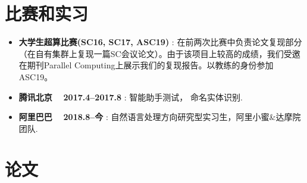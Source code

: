 \documentclass[letterpaper]{article}
\begin{document}
\section*{比赛和实习}
\begin{itemize}
  \item \textbf{大学生超算比赛(SC16, SC17, ASC19)} : 在前两次比赛中负责论文复现部分（在自有集群上复现一篇SC会议论文）。由于该项目上较高的成绩，我们受邀在期刊Parallel Computing上展示我们的复现报告。以教练的身份参加ASC19。
  \item \textbf{腾讯北京 ~ 2017.4--2017.8} : 智能助手测试， 命名实体识别.
  \item \textbf{阿里巴巴 ~ 2018.8--今} : 自然语言处理方向研究型实习生，阿里小蜜\&达摩院团队.
\end{itemize}


\section*{论文}
\end{document}
